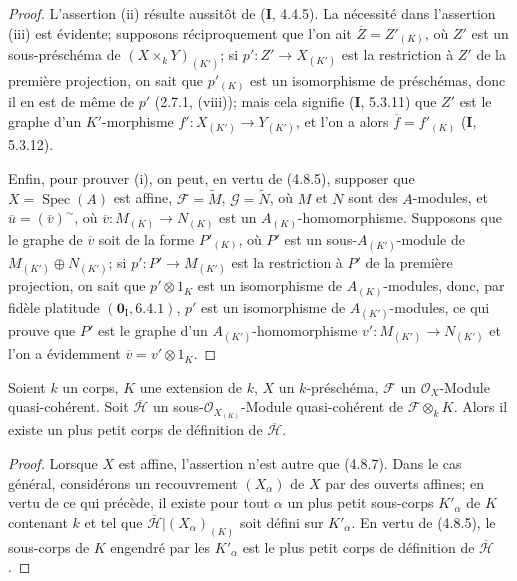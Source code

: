 \begin{proof}
L'assertion (ii) résulte aussitôt de (\textbf{I}, 4.4.5). La nécessité dans l'assertion
(iii) est évidente; supposons réciproquement que l'on ait
$\overline Z=Z'_{(K)}$, où $Z'$ est un sous-préschéma de
$(X\times_kY)_{(K')}$; si $p':Z'\to X_{(K')}$ est la restriction à $Z'$ de la
première projection, on sait que $p'_{(K)}$ est un isomorphisme de préschémas,
donc il en est de même de $p'$ (2.7.1, (viii)); mais cela signifie (\textbf{I}, 5.3.11)
que $Z'$ est le graphe d'un $K'$-morphisme
$f':X_{(K')}\to Y_{(K')}$, et l'on a alors
$\overline f=f'_{(K)}$ (\textbf{I}, 5.3.12).

Enfin, pour prouver (i), on peut, en vertu de (4.8.5), supposer que
$X=\operatorname{Spec}(A)$ est affine, $\mathscr F=\widetilde M$,
$\mathscr G=\widetilde N$, où $M$ et $N$ sont des $A$-modules, et
$\overline u=(\overline v)^{\sim}$, où
$\overline v:M_{(K)}\to N_{(K)}$ est un $A_{(K)}$-homomorphisme. Supposons
que le graphe de $\overline v$ soit de la forme $P'_{(K)}$, où $P'$ est un
sous-$A_{(K')}$-module de $M_{(K')}\oplus N_{(K')}$; si
$p':P'\to M_{(K')}$ est la restriction à $P'$ de la première projection, on
sait que $p'\otimes1_K$ est un isomorphisme de $A_{(K)}$-modules, donc, par
fidèle platitude $(\mathbf{0}_{\mathrm I},6.4.1)$, $p'$ est un isomorphisme de
$A_{(K')}$-modules, ce qui prouve que $P'$ est le graphe d'un
$A_{(K')}$-homomorphisme $v':M_{(K')}\to N_{(K')}$ et l'on a évidemment
$\overline v=v'\otimes1_K$.
\end{proof}

\begin{proposition}[4.8.9]
\label{IV.2.4.8.9-fr}
Soient $k$ un corps, $K$ une extension de $k$, $X$ un $k$-préschéma,
$\mathscr F$ un $\mathcal O_X$-Module quasi-cohérent. Soit $\overline{\mathscr H}$ un
sous-$\mathcal O_{X_{(K)}}$-Module quasi-cohérent de
$\mathscr F\otimes_kK$. Alors il existe un plus petit corps de définition de
$\overline{\mathscr H}$.
\end{proposition}

\begin{proof}
Lorsque $X$ est affine, l'assertion n'est autre que (4.8.7). Dans le cas
général, considérons un recouvrement $(X_\alpha)$ de $X$ par des ouverts
affines; en vertu de ce qui précède, il existe pour tout $\alpha$ un plus petit
sous-corps $K'_\alpha$ de $K$ contenant $k$ et tel que
$\overline{\mathscr H}|(X_\alpha)_{(K)}$ soit défini sur $K'_\alpha$. En vertu de
(4.8.5), le sous-corps de $K$ engendré par les $K'_\alpha$ est le plus petit
corps de définition de $\overline{\mathscr H}$.
\end{proof}

